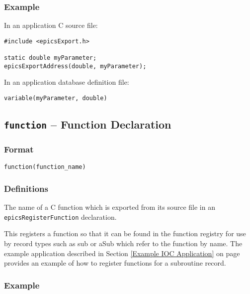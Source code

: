 \subsubsection{Example}

In an application C source file:

\begin{verbatim}
#include <epicsExport.h>

static double myParameter;
epicsExportAddress(double, myParameter);
\end{verbatim}

In an application database definition file:

\begin{verbatim}
variable(myParameter, double)
\end{verbatim}

\subsection{\texttt{function} -- Function Declaration}

\subsubsection{Format}

\begin{verbatim}
function(function_name)
\end{verbatim}

\subsubsection{Definitions}

\begin{description}
\item [function\_name] The name of a C function which is exported from its source file in an \verb|epicsRegisterFunction| declaration.
\end{description}

This registers a function so that it can be found in the function registry for use by record types such as sub or aSub which refer to the function by name.
The example application described in Section \ref{Example IOC Application} on page \pageref{Example IOC Application} provides an example of how to register functions for a subroutine record.

\subsubsection{Example}


